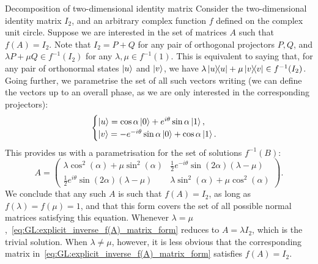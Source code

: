 \begin{examplebox}[label={ex:GL:solutions_f(A)=I2}]{Decomposition of two-dimensional identity matrix}
\fontsize{10pt}{10pt}\selectfont
Consider the two-dimensional identity matrix $I_2$, and an arbitrary complex function $f$ defined on the complex unit circle. Suppose we are interested in the set of matrices $A$ such that $f(A)=I_2$.
Note that $I_2=P+Q$ for any pair of orthogonal projectors $P,Q$, and $\lambda P + \mu Q\in f^{-1}(I_2)$ for any $\lambda,\mu\in f^{-1}(1)$.
This is equivalent to saying that, for any pair of orthonormal states $\ket u$ and $\ket v$, we have
$\lambda \ketbra u + \mu \ketbra v\in f^{-1}(I_2)$.
Going further, we parametrise the set of all such vectors writing (we can define the vectors up to an overall phase, as we are only interested in the corresponding projectors):
\begin{equation}
    \begin{cases}
    \ket u =\cos\alpha\ket 0+e^{i\theta}\sin\alpha \ket 1, \\
    \ket v =-e^{-i\theta}\sin\alpha\ket 0 + \cos\alpha\ket 1.
\end{cases}
\end{equation}
This provides us with a parametrisation for the set of solutions $f^{-1}(B)$:
\begin{equation}
    A = \begin{pmatrix}
        \lambda \cos^2(\alpha)+\mu\sin^2(\alpha) &
        \frac12 e^{-i\theta} \sin(2\alpha) (\lambda-\mu) \\ 
        \frac12 e^{i\theta} \sin(2\alpha) (\lambda-\mu) &
        \lambda \sin^2(\alpha)+\mu\cos^2(\alpha)
    \end{pmatrix}.
    \label{eq:GL:explicit_inverse_f(A)_matrix_form}
\end{equation}
We conclude that any such $A$ is such that $f(A)=I_2$, as long as $f(\lambda)=f(\mu)=1$, and that this form covers the set of all possible normal matrices satisfying this equation.
Whenever $\lambda=\mu$,~\cref{eq:GL:explicit_inverse_f(A)_matrix_form} reduces to $A=\lambda I_2$, which is the trivial solution. When $\lambda\neq\mu$, however, it is less obvious that the corresponding matrix in~\cref{eq:GL:explicit_inverse_f(A)_matrix_form} satisfies $f(A)=I_2$.

\end{examplebox}
